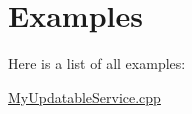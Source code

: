 \section{Examples}
Here is a list of all examples\+:\begin{DoxyCompactItemize}
\item 
\hyperlink{MyUpdatableService_8cpp-example}{My\+Updatable\+Service.\+cpp}
\end{DoxyCompactItemize}
